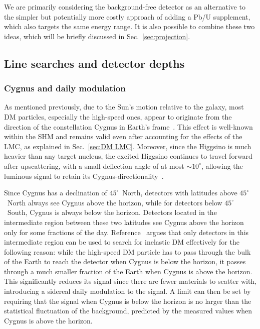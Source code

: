 \documentclass[aps,prd,amsmath,amssymb,10pt,letterpaper,balancelastpage,showpacs,superscriptaddress,nofootinbib,floatfix,notitlepage,longbibliography,twocolumn
]{revtex4-2}
\begin{document}
We are primarily considering the background-free detector as an alternative to the simpler but potentially more costly approach of adding a Pb/U supplement, which also targets the same energy range.  It is also possible to combine these two ideas, which will be briefly discussed in Sec.~\ref{sec:projection}.

\subsection{Line searches and detector depths\label{sec: line search}}
\subsubsection{Cygnus and daily modulation}
As mentioned previously, due to the Sun’s motion relative to the galaxy, most DM particles, especially the high-speed ones, appear to originate from the direction of the constellation Cygnus in Earth’s frame~\cite{Directional_DM, Luminous}. This effect is well-known within the SHM  and remains valid even after accounting for the effects of the LMC, as explained in Sec.~\ref{sec:DM LMC}. Moreover, since the Higgsino is much heavier than any target nucleus, the excited Higgsino continues to travel forward after upscattering, with a small deflection angle of at most $\sim 10^{\circ}$, allowing the luminous signal to retain its Cygnus-directionality~\cite{Luminous}.

Since Cygnus has a declination of $45^\circ$~North, detectors with latitudes above $45^\circ$~North always see Cygnus above the horizon, while for detectors below $45^\circ$~South, Cygnus is always below the horizon. Detectors located in the intermediate region between these two latitudes see Cygnus above the horizon only for some fractions of the day. Reference~\cite{Luminous} argues that only detectors in this intermediate region can be used to search for inelastic DM effectively for the following reason: while the high-speed DM particle has to pass through the bulk of the Earth to reach the detector when Cygnus is below the horizon, it passes through a much smaller fraction of the Earth when Cygnus is above the horizon. This significantly reduces its signal since there are fewer materials to scatter with, introducing a sidereal daily modulation to the signal. A limit can then be set by requiring that the signal when Cygnus is below the horizon is no larger than the statistical fluctuation of the background, predicted by the measured values when Cygnus is above the horizon.
\end{document}
